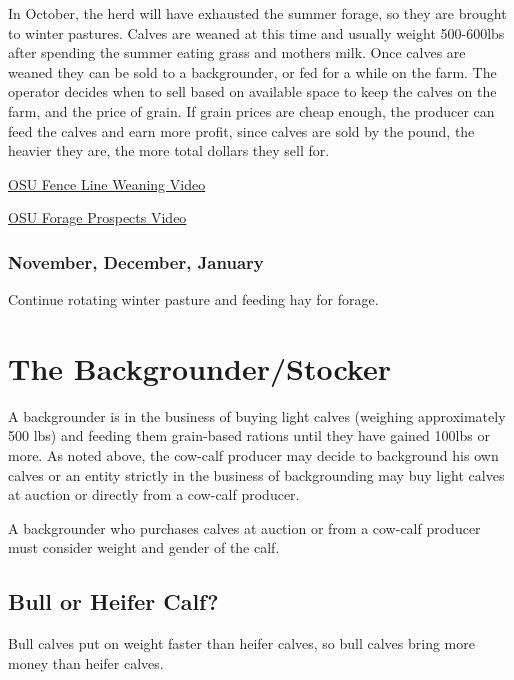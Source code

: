 \documentclass[
]{book}
\begin{document}
In October, the herd will have exhausted the summer forage, so they are brought to winter pastures. Calves are weaned at this time and usually weight 500-600lbs after spending the summer eating grass and mothers milk. Once calves are weaned they can be sold to a backgrounder, or fed for a while on the farm. The operator decides when to sell based on available space to keep the calves on the farm, and the price of grain. If grain prices are cheap enough, the producer can feed the calves and earn more profit, since calves are sold by the pound, the heavier they are, the more total dollars they sell for.

\href{https://www.youtube.com/watch?v=qpGuOOA-fYU}{OSU Fence Line Weaning Video}

\href{https://www.youtube.com/watch?v=JyvTl9PVdMQ\#action=share}{OSU Forage Prospects Video}

\hypertarget{november-december-january}{%
\subsubsection{November, December, January}\label{november-december-january}}

Continue rotating winter pasture and feeding hay for forage.

\hypertarget{the-backgrounderstocker}{%
\section{The Backgrounder/Stocker}\label{the-backgrounderstocker}}

A backgrounder is in the business of buying light calves (weighing approximately 500 lbs) and feeding them grain-based rations until they have gained 100lbs or more. As noted above, the cow-calf producer may decide to background his own calves or an entity strictly in the business of backgrounding may buy light calves at auction or directly from a cow-calf producer.

A backgrounder who purchases calves at auction or from a cow-calf producer must consider weight and gender of the calf.

\hypertarget{bull-or-heifer-calf}{%
\subsection{Bull or Heifer Calf?}\label{bull-or-heifer-calf}}

Bull calves put on weight faster than heifer calves, so bull calves bring more money than heifer calves.
\end{document}
